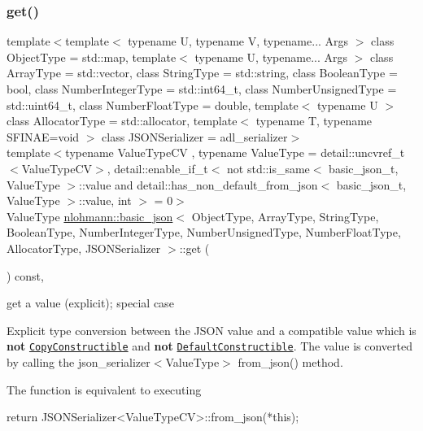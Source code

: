 \subsubsection{\texorpdfstring{get()}{get()}\hspace{0.1cm}{\footnotesize\ttfamily [4/6]}}
{\footnotesize\ttfamily template$<$template$<$ typename U, typename V, typename... Args $>$ class Object\+Type = std\+::map, template$<$ typename U, typename... Args $>$ class Array\+Type = std\+::vector, class String\+Type  = std\+::string, class Boolean\+Type  = bool, class Number\+Integer\+Type  = std\+::int64\+\_\+t, class Number\+Unsigned\+Type  = std\+::uint64\+\_\+t, class Number\+Float\+Type  = double, template$<$ typename U $>$ class Allocator\+Type = std\+::allocator, template$<$ typename T, typename S\+F\+I\+N\+A\+E=void $>$ class J\+S\+O\+N\+Serializer = adl\+\_\+serializer$>$ \\
template$<$typename Value\+Type\+CV , typename Value\+Type  = detail\+::uncvref\+\_\+t$<$\+Value\+Type\+C\+V$>$, detail\+::enable\+\_\+if\+\_\+t$<$ not std\+::is\+\_\+same$<$ basic\+\_\+json\+\_\+t, Value\+Type $>$\+::value and detail\+::has\+\_\+non\+\_\+default\+\_\+from\+\_\+json$<$ basic\+\_\+json\+\_\+t, Value\+Type $>$\+::value, int $>$  = 0$>$ \\
Value\+Type \mbox{\hyperlink{classnlohmann_1_1basic__json}{nlohmann\+::basic\+\_\+json}}$<$ Object\+Type, Array\+Type, String\+Type, Boolean\+Type, Number\+Integer\+Type, Number\+Unsigned\+Type, Number\+Float\+Type, Allocator\+Type, J\+S\+O\+N\+Serializer $>$\+::get (\begin{DoxyParamCaption}{ }\end{DoxyParamCaption}) const\hspace{0.3cm}{\ttfamily [inline]}, {\ttfamily [noexcept]}}



get a value (explicit); special case 

Explicit type conversion between the J\+S\+ON value and a compatible value which is {\bfseries not} \href{https://en.cppreference.com/w/cpp/named_req/CopyConstructible}{\tt Copy\+Constructible} and {\bfseries not} \href{https://en.cppreference.com/w/cpp/named_req/DefaultConstructible}{\tt Default\+Constructible}. The value is converted by calling the json\+\_\+serializer$<$\+Value\+Type$>$ {\ttfamily from\+\_\+json()} method.

The function is equivalent to executing 
\begin{DoxyCode}
\textcolor{keywordflow}{return} JSONSerializer<ValueTypeCV>::from\_json(*\textcolor{keyword}{this});
\end{DoxyCode}


